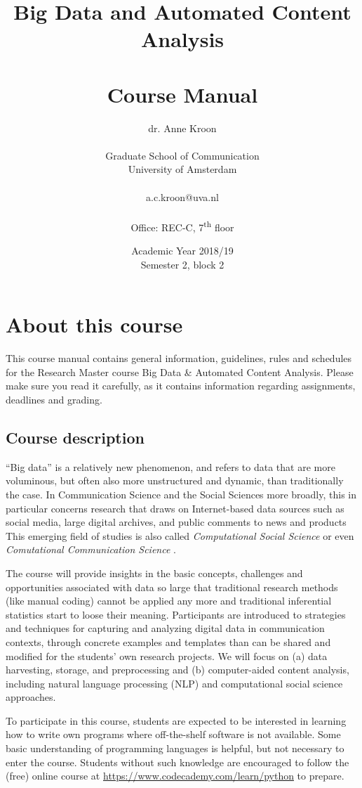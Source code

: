 \documentclass[a4paper,10pt]{report}
\title{Big Data and Automated Content Analysis\\~\\Course Manual}
\author{dr. Anne Kroon\\~\\Graduate School of Communication\\University of Amsterdam\\~\\a.c.kroon@uva.nl\\~\\Office: REC-C, 7\textsuperscript{th} floor}
\date{Academic Year 2018/19\\Semester 2, block 2}
\begin{document}
\maketitle



\chapter{About this course}

This course manual contains general information, guidelines, rules and schedules for the Research Master course Big Data \& Automated Content Analysis. Please make sure you read it carefully, as it  contains information regarding assignments, deadlines and grading.

\section{Course description}
 
``Big data'' is a relatively new phenomenon, and refers to data that are more voluminous, but often also more unstructured and dynamic, than traditionally the case. In Communication Science and the Social Sciences more broadly, this in particular concerns research that draws on Internet-based data sources such as social media, large digital archives, and public comments to news and products This emerging field of studies is also called \emph{Computational Social Science} \citep{Lazer2009} or even \emph{Comutational Communication Science} \citep{Shah2015}.


The course will provide insights in the basic concepts, challenges and opportunities associated with data so large that traditional research methods (like manual coding) cannot be applied any more and traditional inferential statistics start to loose their meaning. Participants are introduced to strategies and techniques for capturing and analyzing digital data in communication contexts, through concrete examples and templates than can be shared and modified for the students’ own research projects. We will focus on (a) data harvesting, storage, and preprocessing and (b) computer-aided content analysis, including natural language processing (NLP) and computational social science approaches.

To participate in this course, students are expected to be interested in learning how to write own programs where off-the-shelf software is not available. Some basic understanding of programming languages is helpful, but not necessary to enter the course. Students without such knowledge are encouraged to follow the (free) online course at \url{https://www.codecademy.com/learn/python} to prepare.
\end{document}
